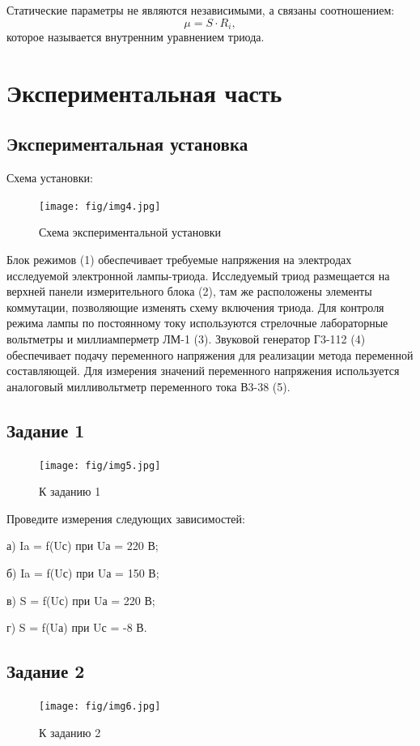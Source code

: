 Статические параметры не являются независимыми, а связаны соотношением:
\begin{equation}
	\mu= S \cdot R_i, 
\end{equation}
которое называется внутренним уравнением триода.

\section{Экспериментальная часть}
\subsection{Экспериментальная установка}
Схема установки:
\begin{figure}[h!]
	\centering
	\texttt{[image: fig/img4.jpg]}
	\caption{Схема экспериментальной установки}
	\label{fig:10}
\end{figure}

Блок режимов (1) обеспечивает требуемые напряжения на электродах исследуемой электронной 
лампы-триода. Исследуемый триод размещается на верхней панели измерительного блока (2), 
там же расположены элементы коммутации, позволяющие изменять схему включения триода. Для 
контроля режима лампы по постоянному току используются стрелочные лабораторные вольтметры 
и миллиамперметр ЛМ-1 (3). Звуковой генератор Г3-112 (4) обеспечивает подачу переменного 
напряжения для реализации метода переменной составляющей. Для измерения значений переменного 
напряжения используется аналоговый милливольтметр переменного тока В3-38 (5).

\subsection{Задание 1}
\begin{figure}[h!]
 	\centering
	\texttt{[image: fig/img5.jpg]}
 	\caption{К заданию 1}
 	\label{fig:11}
\end{figure}

Проведите измерения следующих зависимостей:

а) Ia = f(Uс) при Uа = 220 В; 

б) Ia = f(Uс) при Uа = 150 В;

в) S = f(Uс) при Uа = 220 В; 

г) S = f(Uа) при Uс = -8 В.

\subsection{Задание 2}
\begin{figure}[h!]
 	\centering
	\texttt{[image: fig/img6.jpg]}
 	\caption{К заданию 2}
 	\label{fig:11}
\end{figure}

